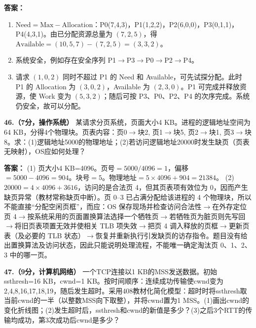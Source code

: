 \ifshowsolutions\par\noindent\textbf{答案：}
\begin{enumerate}[label=(\arabic*),leftmargin=*,itemsep=2pt]
    \item $\mathrm{Need}=\mathrm{Max}-\mathrm{Allocation}$：P0(7,4,3)，P1(1,2,2)，P2(6,0,0)，P3(0,1,1)，P4(4,3,1)。由已分配资源总量为 $(7,2,5)$，得 $\mathrm{Available}=(10,5,7)-(7,2,5)=(3,3,2)$。
    \item 系统安全，例如存在安全序列 P1$\to$P3$\to$P0$\to$P2$\to$P4。
    \item 请求 $(1,0,2)$ 同时不超过 P1 的 Need 和 Available，可先试探分配。此时 P1 的 Allocation 为 $(3,0,2)$，Available 为 $(2,3,0)$。P1 可完成并释放资源，使 Work 变为 $(5,3,2)$；随后可按 P3、P0、P2、P4 的次序完成。系统仍安全，故可以分配。
\end{enumerate}\else \answerarea[8] \fi

\vspace{8pt}

\noindent\textbf{46.（7分，操作系统）} 某请求分页系统，页面大小4 KB。进程的逻辑地址空间为64 KB，分得4个物理块。页表内容：页0$\to$块2, 页1$\to$块5, 页2$\to$块1, 页3$\to$块8。求：(1)逻辑地址5000的物理地址；(2)若访问逻辑地址20000时发生缺页（页表无映射），OS应如何处理？

\ifshowsolutions\par\noindent\textbf{答案：} (1) 页大小4 KB=4096。页号$=5000/4096=1$，偏移$=5000-4096=904$。块号$=5$。物理地址$=5\times4096+904=21384$。
(2) $20000=4\times4096+3616$，访问的是合法页 4，但其页表项有效位为 0，因而产生缺页异常（教材常称缺页中断）。页 0--3 已占满分配给该进程的 4 个物理块，所以不能直接“分配空闲页框”，而应：OS 保存现场并检查访问合法性$\to$在外存定位页 4$\to$按系统采用的页面置换算法选择一个牺牲页$\to$若牺牲页为脏页则先写回$\to$将旧页表项置无效并使相关 TLB 项失效$\to$把页 4 调入释放的页框$\to$更新页表（及必要的 TLB 状态）$\to$恢复并重新执行引发缺页的访存指令。题目没有给出置换算法及访问状态，因此只能说明处理流程，不能唯一确定淘汰页 0、1、2、3 中的哪一页。\else \answerarea[8] \fi

\vspace{8pt}

\noindent\textbf{47.（9分，计算机网络）} 一个TCP连接以1 KB的MSS发送数据。初始ssthresh=16 KB，cwnd=1 KB。按时间顺序：连续成功传输使cwnd变为2,4,8,16,17,18,19，随后发生超时。采用408教材化简化模型：超时时将ssthresh取当前cwnd的一半（以整数MSS向下取整），并将cwnd置为1 MSS。(1)画出cwnd的变化折线图；(2)发生超时后，ssthresh和cwnd的新值是多少？(3)之后3个RTT的传输均成功，第3次成功后cwnd是多少？


